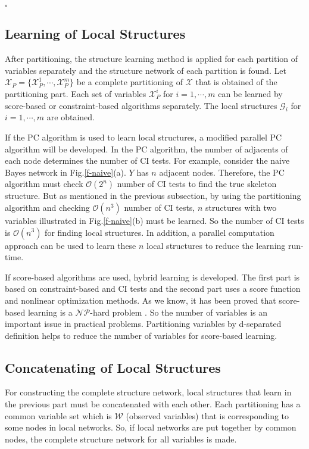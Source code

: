\documentclass{article}
\newcommand{\X}{\mathcal{X}}
\newcommand{\W}{\mathcal{W}}
\newcommand{\G}{\mathcal{G}}
\begin{document}
\hfill$\square$

\subsection{Learning of Local Structures}
After partitioning, the structure learning method is applied for each partition of variables separately and the structure network of each partition is found. 
Let $\X_P = \{\X_P^1,\cdots, \X_P^m \}$ be a complete partitioning of $\X$ that is obtained of the partitioning part.
Each set of variables $\X_P^i$ for $i=1,\cdots,m$ can be learned by score-based or constraint-based algorithms separately. 
The local structures $\G_i$ for $i=1,\cdots,m$ are obtained.

If the PC algorithm is used to learn local structures, a modified parallel PC algorithm will be developed.
In the PC algorithm, the number of adjacents of each node determines the number of CI tests. For example, consider the naive Bayes network in Fig.\ref{f-naive}(a). $Y$ has $n$ adjacent nodes. Therefore, the PC algorithm must check $\mathcal{O}(2^n)$ number of CI tests to find the true skeleton structure. 
But as mentioned in the previous subsection, by using the partitioning algorithm and checking $\mathcal{O}(n^3)$ number of CI tests, $n$ structures with two variables illustrated in Fig.\ref{f-naive}(b) must be learned.
So the number of CI tests is $\mathcal{O}(n^3)$ for finding local structures.
In addition, a parallel computation approach can be used to learn these $n$ local structures to reduce the learning run-time.

If score-based algorithms are used, hybrid learning is developed.
The first part is based on constraint-based and CI tests and the second part uses a score function and nonlinear optimization methods.
As we know, it has been proved that score-based learning is a $\mathcal{NP}$-hard problem \cite{koller}.
So the number of variables is an important issue in practical problems.
Partitioning variables by d-separated definition helps to reduce the number of variables for score-based learning.

\subsection{Concatenating of Local Structures}
For constructing the complete structure network, local structures that learn in the previous part must be concatenated with each other. Each partitioning has a common variable set which is $\W$ (observed variables) that is corresponding to some nodes in local networks. So, if local networks are put together by common nodes, the complete structure network for all variables is made. 
\end{document}
